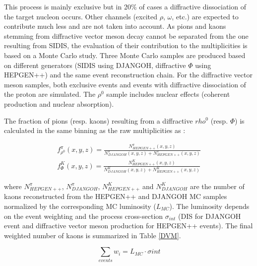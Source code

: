 \documentclass[letterpaper,12pt]{article}
\begin{document}
This process is mainly exclusive but in 20\% of cases a diffractive dissociation of the target nucleon occurs. Other channels (excited $\rho$, $\omega$, etc.)
are expected to contribute much less and are not taken into account. As pions and kaons stemming from diffractive
vector meson decay cannot be separated from the one resulting from SIDIS, the evaluation of their contribution to the multiplicities is based on a
Monte Carlo study. Three Monte Carlo samples are produced based on different generators (SIDIS using DJANGOH, diffractive $\Phi$ using HEPGEN++) and
the same event reconstruction chain. For the diffractive vector meson samples, both exclusive events and events with diffractive dissociation of the
proton are simulated. The $\rho^0$ sample includes nuclear effects (coherent production and nuclear absorption).

The fraction of pions (resp. kaons) resulting from a diffractive $rho^0$ (resp. $\Phi$) is calculated in the same binning as the raw multiplicities as :

\begin{equation}
  \begin{split}
    f^{\pi}_{\rho^0}(x,y,z) = \frac{N^{\pi}_{HEPGEN++}(x,y,z)}{N^{\pi}_{DJANGOH}(x,y,z)+N^{\pi}_{HEPGEN++}(x,y,z)} \\
    f^K_{\Phi}(x,y,z) = \frac{N^K_{HEPGEN++}(x,y,z)}{N^K_{DJANGOH}(x,y,z)+N^K_{HEPGEN++}(x,y,z)}
  \end{split}
\end{equation}

where $N^{\pi}_{HEPGEN++}$, $N^{\pi}_{DJANGOH}$, $N^K_{HEPGEN++}$ and $N^K_{DJANGOH}$ are the number of kaons reconstructed from the HEPGEN++ and DJANGOH MC samples normalized by the corresponding
MC luminosity ($L_{MC}$). The luminosity depends on the event weighting and the process cross-section $\sigma_{int}$ (DIS for DJANGOH event and diffractive
vector meson production for HEPGEN++ events). The final weighted number of kaons is summarized in Table \ref{DVM}.

\begin{equation}
  \sum_{events} w_i = L_{MC} \cdot \sigma{int}
\end{equation}
\end{document}
